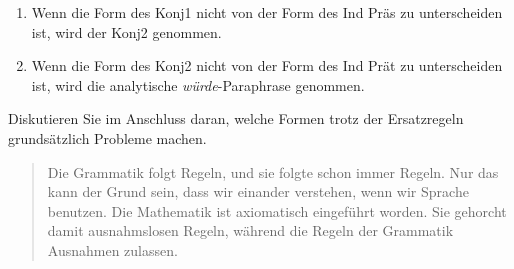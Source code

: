 \documentclass[12pt,a4paper,twoside]{article}
\newcommand{\Lf}{
  \setlength{\itemsep}{1pt}
  \setlength{\parskip}{0pt}
  \setlength{\parsep}{0pt}
}
\begin{document}
\begin{enumerate}\Lf
  \item Wenn die Form des Konj1 nicht von der Form des Ind Präs zu unterscheiden ist, wird der Konj2 genommen.
  \item Wenn die Form des Konj2 nicht von der Form des Ind Prät zu unterscheiden ist, wird die analytische \textit{würde}-Paraphrase genommen.
\end{enumerate}

Diskutieren Sie im Anschluss daran, welche Formen trotz der Ersatzregeln grundsätzlich Probleme machen.

\begin{quote}
  Die Grammatik folgt Regeln, und sie folgte schon immer Regeln.
  Nur das kann der Grund sein, dass wir einander verstehen, wenn wir Sprache benutzen.
  Die Mathematik ist axiomatisch eingeführt worden.
  Sie gehorcht damit ausnahmslosen Regeln, während die Regeln der Grammatik Ausnahmen zulassen.
\end{quote}


\end{document}

